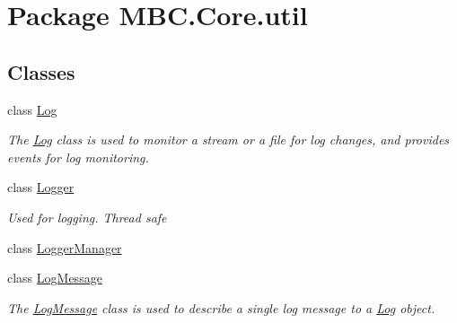 \hypertarget{namespace_m_b_c_1_1_core_1_1util}{\section{Package M\-B\-C.\-Core.\-util}
\label{namespace_m_b_c_1_1_core_1_1util}
}
\subsection*{Classes}
\begin{DoxyCompactItemize}
\item 
class \hyperlink{class_m_b_c_1_1_core_1_1util_1_1_log}{Log}
\begin{DoxyCompactList}\small\item\em The \hyperlink{class_m_b_c_1_1_core_1_1util_1_1_log}{Log} class is used to monitor a stream or a file for log changes, and provides events for log monitoring.\end{DoxyCompactList}\item 
class \hyperlink{class_m_b_c_1_1_core_1_1util_1_1_logger}{Logger}
\begin{DoxyCompactList}\small\item\em Used for logging. Thread safe\end{DoxyCompactList}\item 
class \hyperlink{class_m_b_c_1_1_core_1_1util_1_1_logger_manager}{Logger\-Manager}
\item 
class \hyperlink{class_m_b_c_1_1_core_1_1util_1_1_log_message}{Log\-Message}
\begin{DoxyCompactList}\small\item\em The \hyperlink{class_m_b_c_1_1_core_1_1util_1_1_log_message}{Log\-Message} class is used to describe a single log message to a \hyperlink{class_m_b_c_1_1_core_1_1util_1_1_log}{Log} object.\end{DoxyCompactList}\end{DoxyCompactItemize}
